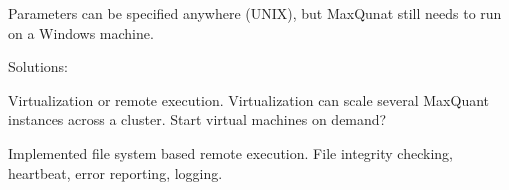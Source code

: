 Parameters can be specified anywhere (UNIX), but
MaxQunat still needs to run on a Windows machine.

Solutions:

Virtualization or remote execution. Virtualization can
scale several MaxQuant instances across a cluster. Start virtual
machines on demand?

Implemented file system based remote execution. File integrity checking,
heartbeat, error reporting, logging.
